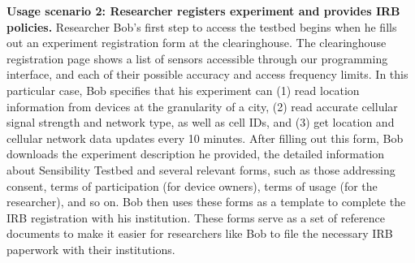 {{%

\smallskip

\textbf{Usage scenario 2: Researcher registers experiment and provides IRB policies.}
 Researcher Bob's first step to access the testbed begins when he
fills out an experiment registration form at the 
clearinghouse. The clearinghouse registration page shows 
a list of sensors accessible through our programming interface, and 
each of their possible accuracy and access frequency limits. 
In this particular case, Bob specifies that 
his experiment can (1) read location information
from devices at the granularity of a city, (2) read accurate
cellular signal strength and network type, as well as
cell IDs, and (3) get location and
cellular network data updates every 10 minutes. 
%
After filling out this form, Bob downloads the experiment description 
he provided, the detailed information about Sensibility Testbed and 
several relevant forms, such as 
those addressing consent, terms of participation (for device owners),  
terms of usage (for the researcher), and so on.   
Bob then uses these forms as a template to complete the IRB registration 
with his institution. These forms serve as a set of reference documents 
to make it easier for researchers like Bob to 
file the necessary IRB paperwork with their institutions.

}}
